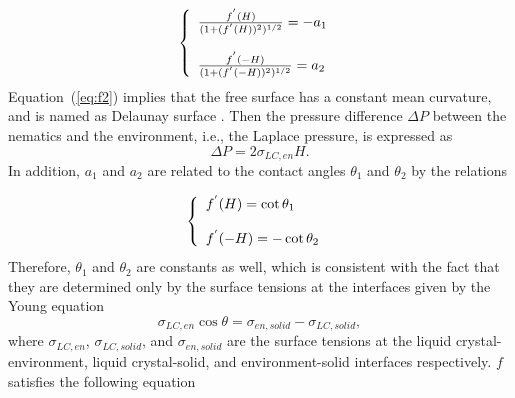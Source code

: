 \documentclass[nottitlepage]{article}
\begin{document}
 \begin{equation}\label{eq:f3}
             \left\{
             \begin{array}{l l l}
             \frac{f^{'}(H)}{(1+(f^{'}(H))^2)^{1/2}}=-a_1\\
             \\
             \frac{f^{'}(-H)}{(1+(f^{'}(-H))^2)^{1/2}}=a_2
             \end{array}
             \right.\
        \end{equation}
Equation~(\ref{eq:f2}) implies that the free surface has a constant mean curvature, and is named as Delaunay surface \cite{paragoda}. Then the pressure difference $\Delta P$ between the nematics and the environment, i.e., the Laplace pressure, is expressed as \cite{sk}
\begin{equation}\label{eq:delta2}
\Delta P=2\sigma_{LC,en}H.
\end{equation}
In addition, $a_1$ and $a_2$ are related to the contact angles $\theta_1$ and $\theta_2$ by the relations \cite{vogel, vogel2}

 \begin{equation}\label{eq:f5}
             \left\{
             \begin{array}{l l l}
             f^{'}(H)=\cot \theta_1\\
             \\
             f^{'}(-H)=-\cot \theta_2
             \end{array}
             \right.\
        \end{equation}
Therefore, $\theta_1$ and $\theta_2$ are constants as well, which is consistent with the fact that they are determined only by the surface tensions at the interfaces given by the Young equation \cite{lopez}
\begin{equation}\label{eq:sigma}
\sigma_{LC,en}\cos \theta=\sigma_{en,solid}-\sigma_{LC,solid},
\end{equation}
where $\sigma_{LC,en}$, $\sigma_{LC,solid}$, and $\sigma_{en,solid}$ are the surface tensions at the liquid crystal-environment, liquid crystal-solid, and environment-solid interfaces respectively. $f$ satisfies the following equation
 \cite{paragoda}
\end{document}
